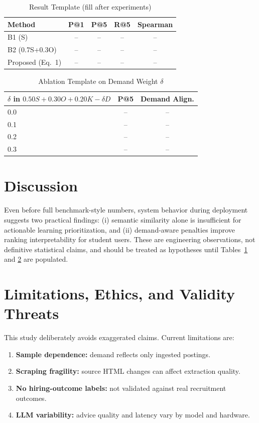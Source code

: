 \documentclass[conference]{IEEEtran}
\begin{document}
\begin{table}[t]
\caption{Result Template (fill after experiments)}
\label{tab:results}
\centering
\begin{tabular}{lcccc}
\toprule
Method & P@1 & P@5 & R@5 & Spearman \\
\midrule
B1 (S) & -- & -- & -- & -- \\
B2 (0.7S+0.3O) & -- & -- & -- & -- \\
Proposed (Eq.~1) & -- & -- & -- & -- \\
\bottomrule
\end{tabular}
\end{table}

\begin{table}[t]
\caption{Ablation Template on Demand Weight $\delta$}
\label{tab:ablation}
\centering
\begin{tabular}{lcc}
\toprule
$\delta$ in $0.50S+0.30O+0.20K-\delta D$ & P@5 & Demand Align. \\
\midrule
0.0 & -- & -- \\
0.1 & -- & -- \\
0.2 & -- & -- \\
0.3 & -- & -- \\
\bottomrule
\end{tabular}
\end{table}

\section{Discussion}
Even before full benchmark-style numbers, system behavior during deployment suggests two practical findings: (i) semantic similarity alone is insufficient for actionable learning prioritization, and (ii) demand-aware penalties improve ranking interpretability for student users. These are engineering observations, not definitive statistical claims, and should be treated as hypotheses until Tables~\ref{tab:results} and \ref{tab:ablation} are populated.

\section{Limitations, Ethics, and Validity Threats}
This study deliberately avoids exaggerated claims. Current limitations are:
\begin{enumerate}
    \item \textbf{Sample dependence:} demand reflects only ingested postings.
    \item \textbf{Scraping fragility:} source HTML changes can affect extraction quality.
    \item \textbf{No hiring-outcome labels:} not validated against real recruitment outcomes.
    \item \textbf{LLM variability:} advice quality and latency vary by model and hardware.
\end{enumerate}
\end{document}
